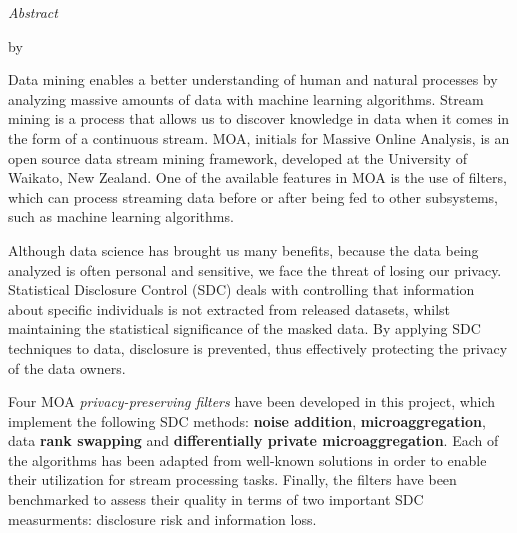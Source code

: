 
\thispagestyle{plain}
\null\vfil
\begin{center}
	\setlength{\parskip}{0pt}
	{\huge{\textit{Abstract}} \par}
	\bigskip
	{\Large\bf \ttitle \par} %
	\medskip
	{\normalsize by \authornames \par} %
\end{center}

Data mining enables a better understanding of human and natural processes by analyzing massive amounts of data with machine learning algorithms. Stream mining is a process that allows us to discover knowledge in data when it comes in the form of a continuous stream. MOA, initials for Massive Online Analysis, is an open source data stream mining framework, developed at the University of Waikato, New Zealand. One of the available features in MOA is the use of filters, which can process streaming data before or after being fed to other subsystems, such as machine learning algorithms.

Although data science has brought us many benefits, because the data being analyzed is often personal and sensitive, we face the threat of losing our privacy. Statistical Disclosure Control (SDC) deals with controlling that information about specific individuals is not extracted from released datasets, whilst maintaining the statistical significance of the masked data. By applying SDC techniques to data, disclosure is prevented, thus effectively protecting the privacy of the data owners.

Four MOA \textit{privacy-preserving filters} have been developed in this project, which implement the following SDC methods: \textbf{noise addition}, \textbf{microaggregation}, data \textbf{rank swapping} and \textbf{differentially private microaggregation}. Each of the algorithms has been adapted from well-known solutions in order to enable their utilization for stream processing tasks. Finally, the filters have been benchmarked to assess their quality in terms of two important SDC measurments: disclosure risk and information loss.

\clearpage %

